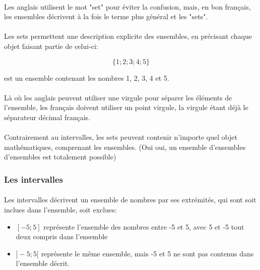 \documentclass[a4paper]{book}
\begin{document}
    \paragraph{}
    Les anglais utilisent le mot "set" pour éviter la confusion, mais, en bon français, les ensembles décrivent à la fois le terme plus général et les "sets".
    
    \paragraph{}
    Les sets permettent une description explicite des ensembles, en précisant chaque objet faisant partie de celui-ci:
    
    $$\{1; 2; 3; 4; 5\}$$
    
    est un ensemble contenant les nombres 1, 2, 3, 4 et 5.
    
    \paragraph{}
    Là où les anglais peuvent utiliser une virgule pour séparer les éléments de l'ensemble, les français doivent utiliser un point virgule, la virgule étant déjà le séparateur décimal français.
    
    \paragraph{}
    Contrairement au intervalles, les sets peuvent contenir n'importe quel objet mathématiques, comprenant les ensembles. (Oui oui, un ensemble d'ensembles d'ensembles est totalement possible)
    \subsubsection{Les intervalles}
    \paragraph{}
    Les intervalles décrivent un ensemble de nombres par ses extrémités, qui sont soit inclues dans l'ensemble, soit exclues:
    
    \begin{itemize}
        \item $[-5; 5]$ représente l'ensemble des nombres entre -5 et 5, avec 5 et -5 tout deux compris dans l'ensemble
        \item $]-5; 5[$ représente le même ensemble, mais -5 et 5 ne sont pas contenus dans l'ensemble décrit.
    \end{itemize}
    
\end{document}
